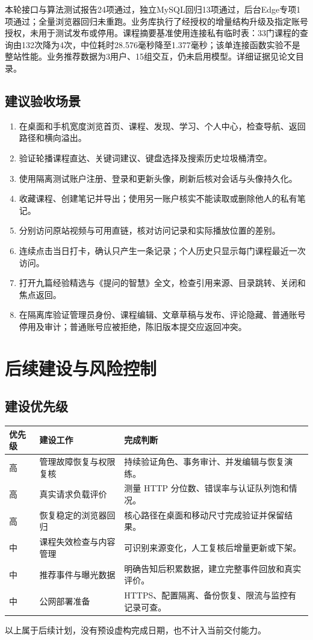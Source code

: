 \documentclass[UTF8,12pt,a4paper,openany,oneside]{ctexbook}
\begin{document}
本轮接口与算法测试报告24项通过，独立MySQL回归13项通过，后台Edge专项1项通过；全量浏览器回归未重跑。业务库执行了经授权的增量结构升级及指定账号授权，未用于测试发布或停用。课程摘要基准使用连接私有临时表：33门课程的查询由132次降为4次，中位耗时28.576毫秒降至1.377毫秒；该单连接函数实验不是整站性能。业务推荐数据为3用户、15组交互，仍未启用模型。详细证据见论文目录。

\section{建议验收场景}
\begin{enumerate}
\item 在桌面和手机宽度浏览首页、课程、发现、学习、个人中心，检查导航、返回路径和横向溢出。
\item 验证轮播课程直达、关键词建议、键盘选择及搜索历史垃圾桶清空。
\item 使用隔离测试账户注册、登录和更新头像，刷新后核对会话与头像持久化。
\item 收藏课程、创建笔记并导出；使用另一账户核实不能读取或删除他人的私有笔记。
\item 分别访问原站视频与可用直链，核对访问记录和实际播放位置的差别。
\item 连续点击当日打卡，确认只产生一条记录；个人历史只显示每门课程最近一次访问。
\item 打开九篇经验精选与《提问的智慧》全文，检查引用来源、目录跳转、关闭和焦点返回。
\item 在隔离库验证管理员身份、课程编辑、文章草稿与发布、评论隐藏、普通账号停用及审计；普通账号应被拒绝，陈旧版本提交应返回冲突。
\end{enumerate}

\chapter{后续建设与风险控制}
\section{建设优先级}
{\small
\begin{longtable}{P{0.12\textwidth}P{0.38\textwidth}P{0.37\textwidth}}
\toprule 优先级 & 建设工作 & 完成判断 \\ \midrule
高 & 管理故障恢复与权限复核 & 持续验证角色、事务审计、并发编辑与恢复演练。 \\
高 & 真实请求负载评价 & 测量 HTTP 分位数、错误率与认证队列饱和情况。 \\
高 & 恢复稳定的浏览器回归 & 核心路径在桌面和移动尺寸完成验证并保留结果。 \\
中 & 课程失效检查与内容管理 & 可识别来源变化，人工复核后增量更新或下架。 \\
中 & 推荐事件与曝光数据 & 明确告知后积累数据，建立完整事件回放和真实评价。 \\
中 & 公网部署准备 & HTTPS、配置隔离、备份恢复、限流与监控有记录可查。 \\
\bottomrule
\end{longtable}}
以上属于后续计划，没有预设虚构完成日期，也不计入当前交付能力。
\end{document}
